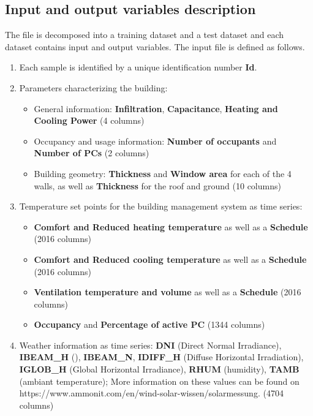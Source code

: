 \documentclass[nolayout]{article}
\begin{document}
\subsection*{Input and output variables description}
The file is decomposed into a training dataset  and a test dataset and each dataset contains input and output variables.
 The input file is defined as follows. 
\begin{enumerate}[-]
    \item Each sample is identified by a unique identification number {\bf Id}.
    \item Parameters characterizing the building:
    \begin{itemize}
        \item General information: {\bf Infiltration}, {\bf Capacitance}, {\bf Heating and Cooling Power} (4 columns)
        \item Occupancy and usage information: {\bf Number of occupants} and {\bf Number of PCs} (2 columns)
        \item Building geometry: {\bf Thickness} and {\bf Window area} for each of the 4 walls, as well as {\bf Thickness} for the roof and ground (10 columns)
    \end{itemize}
    
    \item Temperature set points for the building management system as time series:
    \begin{itemize}
        \item {\bf Comfort and Reduced heating temperature} as well as a {\bf Schedule} (2016 columns)
        \item {\bf Comfort and Reduced cooling temperature} as well as a {\bf Schedule} (2016 columns)
        \item {\bf Ventilation temperature and volume} as well as a {\bf Schedule} (2016 columns)
        \item {\bf Occupancy} and {\bf Percentage of active PC} (1344 columns)
    \end{itemize}{}
    
    \item Weather information as time series: {\bf DNI} (Direct Normal Irradiance), {\bf IBEAM\_H} (), {\bf IBEAM\_N}, {\bf IDIFF\_H} (Diffuse Horizontal Irradiation), {\bf IGLOB\_H} (Global Horizontal Irradiance), {\bf RHUM} (humidity), {\bf TAMB} (ambiant temperature); More information on these values can be found on https://www.ammonit.com/en/wind-solar-wissen/solarmessung. (4704 columns)
    
    \end{enumerate}
    
\end{document}
